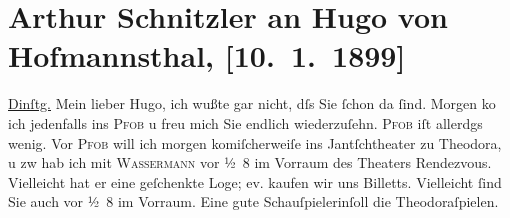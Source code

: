 

         
         \renewcommand{\erwaehntePersonen}{Personen: Elisabeth Anders, Hugo von Hofmannsthal, Jakob Wassermann}
         \renewcommand{\erwaehnteInstitutionen}{Institutionen: Burgtheater}
         \renewcommand{\erwaehnteOrte}{Orte: Café Pfob, Jantsch-Theater, Wien}
         \renewcommand{\erwaehnteWerke}{Werke: Der grüne Kakadu. Groteske in einem Akt, Theodora}
               \section[Arthur Schnitzler an Hugo von Hofmannsthal, {[}10. 1. 1899{]}]{ Arthur Schnitzler an Hugo von Hofmannsthal, {[}10. 1. 1899{]}}\nopagebreak{}\rehead{ }\begin{ledgroupsized}[t]{13cm}\normalsize\beginnumbering{} \toendnotes[C]{\smallbreak\pagebreak[2]} 
\toendnotes[C]{\smallbreak}\pstart
           \raggedleft{}{\pb}\uline{Dinſtg.}\pend
           \pstart
           Mein lieber Hugo, ich wußte gar nicht, dſs Sie ſchon da ſind. Morgen
                  ko{\geminationm} ich jedenfalls ins \textsc{Pfob} u freu mich Sie endlich wiederzuſehn. \textsc{Pfob} iſt allerdgs wenig. Vor \textsc{Pfob} will ich morgen komiſcherweiſe ins Jantſchtheater zu Theodora, u zw hab
               ich mit \textsc{Wassermann} vor ½ 8 im Vorraum des Theaters Rendezvous. Vielleicht hat er eine
                  {\pb}geſchenkte Loge; ev. kaufen wir uns Billetts.
               Vielleicht ſind Sie auch vor ½ 8 im Vorraum. Eine gute Schauſpielerinſoll die Theodoraſpielen.\pend

\end{ledgroupsized}
